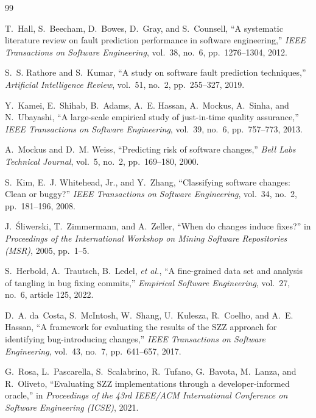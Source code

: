 \documentclass[12pt,a4paper,oneside]{report}
\begin{document}
{\small\singlespacing
\begin{thebibliography}{99}
\setlength{\itemsep}{1pt}

T.~Hall, S.~Beecham, D.~Bowes, D.~Gray, and S.~Counsell, ``A systematic
literature review on fault prediction performance in software engineering,''
\emph{IEEE Transactions on Software Engineering}, vol.~38, no.~6,
pp.~1276--1304, 2012.

S.~S. Rathore and S.~Kumar, ``A study on software fault prediction
techniques,'' \emph{Artificial Intelligence Review}, vol.~51, no.~2,
pp.~255--327, 2019.

Y.~Kamei, E.~Shihab, B.~Adams, A.~E. Hassan, A.~Mockus, A.~Sinha, and
N.~Ubayashi, ``A large-scale empirical study of just-in-time quality
assurance,'' \emph{IEEE Transactions on Software Engineering}, vol.~39, no.~6,
pp.~757--773, 2013.

A.~Mockus and D.~M. Weiss, ``Predicting risk of software changes,'' \emph{Bell
Labs Technical Journal}, vol.~5, no.~2, pp.~169--180, 2000.

S.~Kim, E.~J. Whitehead, Jr., and Y.~Zhang, ``Classifying software changes:
Clean or buggy?'' \emph{IEEE Transactions on Software Engineering}, vol.~34,
no.~2, pp.~181--196, 2008.

J.~\'{S}liwerski, T.~Zimmermann, and A.~Zeller, ``When do changes induce
fixes?'' in \emph{Proceedings of the International Workshop on Mining Software
Repositories (MSR)}, 2005, pp.~1--5.

S.~Herbold, A.~Trautsch, B.~Ledel, \emph{et al.}, ``A fine-grained data set and
analysis of tangling in bug fixing commits,'' \emph{Empirical Software
Engineering}, vol.~27, no.~6, article 125, 2022.

D.~A. da~Costa, S.~McIntosh, W.~Shang, U.~Kulesza, R.~Coelho, and A.~E.
Hassan, ``A framework for evaluating the results of the SZZ approach for
identifying bug-introducing changes,'' \emph{IEEE Transactions on Software
Engineering}, vol.~43, no.~7, pp.~641--657, 2017.

G.~Rosa, L.~Pascarella, S.~Scalabrino, R.~Tufano, G.~Bavota, M.~Lanza, and
R.~Oliveto, ``Evaluating SZZ implementations through a developer-informed
oracle,'' in \emph{Proceedings of the 43rd IEEE/ACM International Conference on
Software Engineering (ICSE)}, 2021.


\end{thebibliography}}
\end{document}
